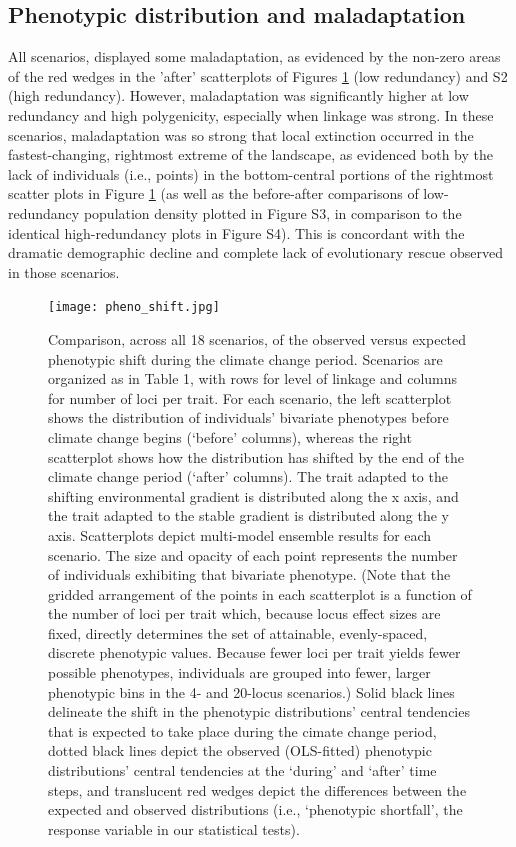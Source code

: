 \documentclass[9pt,twocolumn,twoside,lineno]{pnas-new}
\begin{document}
\subsection{Phenotypic distribution and maladaptation}

All scenarios, displayed some maladaptation, as evidenced by the non-zero areas of the red wedges
in the 'after' scatterplots of Figures \ref{fig:pheno_shift} (low redundancy) and S2 (high redundancy).
However, maladaptation was significantly higher at low redundancy and high polygenicity,
especially when linkage was strong. 
In these scenarios, maladaptation was so strong that local extinction occurred
in the fastest-changing, rightmost extreme of the landscape,
as evidenced both by the lack of individuals (i.e., points)
in the bottom-central portions
of the rightmost scatter plots in Figure \ref{fig:pheno_shift}
(as well as the before-after comparisons of low-redundancy population density plotted in
Figure S3, in comparison to the identical high-redundancy plots in Figure S4).
This is concordant with the dramatic demographic decline and complete lack of evolutionary rescue
observed in those scenarios.

\begin{figure}
\centering
\texttt{[image: pheno\_shift.jpg]}
\caption{Comparison, across all 18 scenarios, of the observed versus expected phenotypic shift during the climate change period. Scenarios are organized as in Table 1, with rows for level of linkage and columns for number of loci per trait. For each scenario, the left scatterplot shows the distribution of individuals’ bivariate phenotypes before climate change begins (‘before’ columns), whereas the right scatterplot shows how the distribution has shifted by the end of the climate change period (‘after’ columns). The trait adapted to the shifting environmental gradient is distributed along the x axis, and the trait adapted to the stable gradient is distributed along the y axis. Scatterplots depict multi-model ensemble results for each scenario. The size and opacity of each point represents the number of individuals exhibiting that bivariate phenotype. (Note that the gridded arrangement of the points in each scatterplot is a function of the number of loci per trait which, because locus effect sizes are fixed, directly determines the set of attainable, evenly-spaced, discrete phenotypic values. Because fewer loci per trait yields fewer possible phenotypes, individuals are grouped into fewer, larger phenotypic bins in the 4- and 20-locus scenarios.) Solid black lines delineate the shift in the phenotypic distributions’ central tendencies that is expected to take place during the cimate change period, dotted black lines depict the observed (OLS-fitted) phenotypic distributions’ central tendencies at the ‘during’ and ‘after’ time steps, and translucent red wedges depict the differences between the expected and observed distributions (i.e., ‘phenotypic shortfall’, the response variable in our statistical tests).
}
\label{fig:pheno_shift}
\end{figure}
\end{document}
